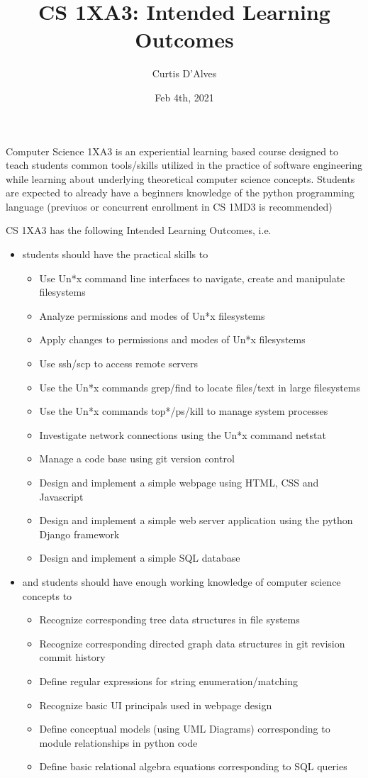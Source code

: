 \documentclass{article}
\author{Curtis D'Alves}
\date{Feb 4th, 2021}
\title{CS 1XA3: Intended Learning Outcomes}
\begin{document}
\maketitle
Computer Science 1XA3 is an experiential learning based course designed to teach
students common tools/skills utilized in the practice of software engineering
while learning about underlying theoretical computer science concepts. Students
are expected to already have a beginners knowledge of the python programming
language (previuos or concurrent enrollment in CS 1MD3 is recommended)

\vspace{3mm}
\noindent
CS 1XA3 has the following Intended Learning Outcomes, i.e. 
\begin{itemize}
\item students should have the practical skills to
\begin{itemize}
\item Use Un*x command line interfaces to navigate, create and manipulate filesystems
\item Analyze permissions and modes of Un*x filesystems
\item Apply changes to permissions and modes of Un*x filesystems
\item Use ssh/scp to access remote servers
\item Use the Un*x commands grep/find to locate files/text in large filesystems
\item Use the Un*x commands top*/ps/kill to manage system processes
\item Investigate network connections using the Un*x command netstat
\item Manage a code base using git version control
\item Design and implement a simple webpage using HTML, CSS and Javascript
\item Design and implement a simple web server application using the python Django framework
\item Design and implement a simple SQL database
\end{itemize}

\item and students should have enough working knowledge of computer science concepts to
\begin{itemize}
\item Recognize corresponding tree data structures in file systems
\item Recognize corresponding directed graph data structures in git revision commit history
\item Define regular expressions for string enumeration/matching
\item Recognize basic UI principals used in webpage design
\item Define conceptual models (using UML Diagrams) corresponding to module
relationships in python code
\item Define basic relational algebra equations corresponding to SQL queries
\end{itemize}
\end{itemize}
\end{document}

